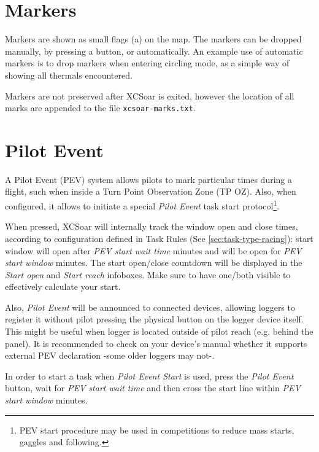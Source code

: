 \section{Markers}\label{sec:markers}

Markers are shown as small flags (a) on the map.  The markers can be dropped
manually, by pressing a button, or automatically.  An example use of
automatic markers is to drop markers when entering circling mode, as a
simple way of showing all thermals encountered.

Markers are not preserved after XCSoar is exited, however the location
of all marks are appended to the file \verb|xcsoar-marks.txt|.

\section{Pilot Event}\label{sec:pilotevent}

A Pilot Event (PEV) system allows pilots to mark particular times during a
flight, such when inside a Turn Point Observation Zone (TP OZ). Also, when
configured, it allows to initiate a special \emph{Pilot Event} task start
protocol\footnote{PEV start procedure may be used in competitions to reduce
mass starts, gaggles and following.}.


When pressed, XCSoar will internally track the window open and close times, according 
to configuration defined in Task Rules (See \ref{sec:task-type-racing}): start
window will open after \emph{PEV start wait time}  minutes
and will be open for \emph{PEV start window} minutes. The start open/close
countdown will be displayed in the \emph{Start open} and \emph{Start reach} 
infoboxes. Make sure to have one/both visible to effectively calculate your start.

Also, \emph{Pilot Event} will be announced to connected devices, allowing loggers to
register it without pilot pressing the physical button on the logger device
itself. This might be useful when logger is located outside of pilot reach
(e.g. behind the panel). It is recommended to check on your device's manual 
whether it supports external PEV declaration -some older loggers may not-.

In order to start a task when \emph{Pilot Event Start} is used, press the \emph
{Pilot Event} button, wait for \emph{PEV start wait time} and then cross the
start line within \emph{PEV start window} minutes.

